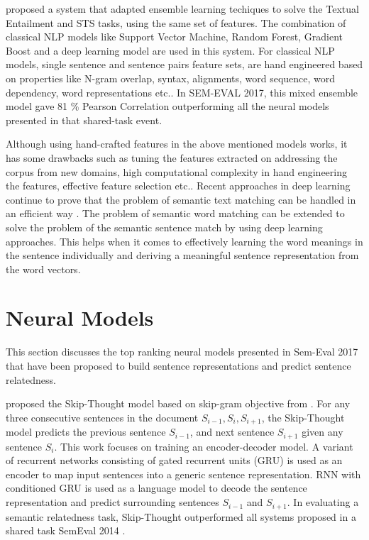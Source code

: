 \documentclass[12pt]{report} %
\begin{document}
\cite{tian2017ecnu} proposed a system that adapted ensemble learning techiques to solve the Textual Entailment and STS tasks, using the same set of features. The combination of classical NLP models like Support Vector Machine, Random Forest, Gradient Boost and a deep learning model are used in this system. For classical NLP models, single sentence and sentence pairs feature sets, are hand engineered based on properties like N-gram overlap, syntax, alignments, word sequence, word dependency, word representations etc.. In SEM-EVAL 2017, this mixed ensemble model gave 81 \% Pearson Correlation outperforming all the neural models presented in that shared-task event.

Although using hand-crafted features in the above mentioned models works, it has some drawbacks such as tuning the features extracted on addressing the corpus from new domains, high computational complexity in hand engineering the features, effective feature selection etc.. Recent approaches in deep learning continue to prove that the problem of semantic text matching can be handled in an efficient way \citep{cer2017semeval}. The problem of semantic word matching can be extended to solve the problem of the semantic sentence match by using deep learning approaches. This helps when it comes to effectively learning the word meanings in the sentence individually and deriving a meaningful sentence representation from the word vectors.  

\section{Neural Models} 

This section discusses the top ranking neural models presented in Sem-Eval 2017 that have been proposed to build sentence representations and predict sentence relatedness.

\cite{kiros2015skip} proposed the Skip-Thought model based on skip-gram objective from \cite{mikolov2014word2vec}. For any three consecutive sentences in the document $S_{i-1}, S_{i}, S_{i+1}$, the Skip-Thought model predicts the previous sentence $S_{i-1}$, and next sentence $S_{i+1}$ given any sentence $S_{i}$.
This work focuses on training an encoder-decoder model. A variant of recurrent networks consisting of gated recurrent units (GRU) \citep{cho2014learning} is used as an encoder to map input sentences into a generic sentence representation. RNN with conditioned GRU is used as a language model to decode the sentence representation and predict surrounding sentences $S_{i-1}$ and $S_{i+1}$. In evaluating a semantic relatedness task, Skip-Thought outperformed all systems proposed in a shared task SemEval 2014 \citep{marelli2014semeval}.
\end{document}
